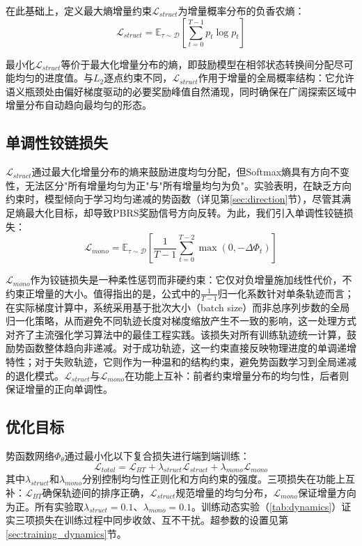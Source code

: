 在此基础上，定义最大熵增量约束$\mathcal{L}_{struct}$为增量概率分布的负香农熵：
\begin{equation}
\label{eq:lstruct}
    \mathcal{L}_{struct} = \mathbb{E}_{\tau \sim \mathcal{D}} \left[ \sum_{t=0}^{T-1} p_t \log p_t \right]
\end{equation}

最小化$\mathcal{L}_{struct}$等价于最大化增量分布的熵，即鼓励模型在相邻状态转换间分配尽可能均匀的进度值。与$L_2$逐点约束不同，$\mathcal{L}_{struct}$作用于增量的全局概率结构：它允许语义瓶颈处由偏好梯度驱动的必要奖励峰值自然涌现，同时确保在广阔探索区域中增量分布自动趋向最均匀的形态。

\subsection{单调性铰链损失}

$\mathcal{L}_{struct}$通过最大化增量分布的熵来鼓励进度均匀分配，但Softmax熵具有方向不变性，无法区分"所有增量均匀为正"与"所有增量均匀为负"。实验表明，在缺乏方向约束时，模型倾向于学习均匀递减的势函数（详见第\ref{sec:direction}节），尽管其满足熵最大化目标，却导致PBRS奖励信号方向反转。为此，我们引入单调性铰链损失：
\begin{equation}
\label{eq:lmono}
    \mathcal{L}_{mono} = \mathbb{E}_{\tau \sim \mathcal{D}} \left[ \frac{1}{T-1}\sum_{t=0}^{T-2} \max(0, -\Delta\Phi_t) \right]
\end{equation}

$\mathcal{L}_{mono}$作为铰链损失是一种柔性惩罚而非硬约束：它仅对负增量施加线性代价，不约束正增量的大小。值得指出的是，公式中的$\frac{1}{T-1}$归一化系数针对单条轨迹而言；在实际梯度计算中，系统采用基于批次大小（batch size）而非总序列步数的全局归一化策略，从而避免不同轨迹长度对梯度缩放产生不一致的影响，这一处理方式对齐了主流强化学习算法中的最佳工程实践。该损失对所有训练轨迹统一计算，鼓励势函数整体趋向非递减。对于成功轨迹，这一约束直接反映物理进度的单调递增特性；对于失败轨迹，它则作为一种温和的结构约束，避免势函数学习到全局递减的退化模式。$\mathcal{L}_{struct}$与$\mathcal{L}_{mono}$在功能上互补：前者约束增量分布的均匀性，后者则保证增量的正向单调性。

\subsection{优化目标}
\label{sec:joint_objective}

势函数网络$\Phi_\theta$通过最小化以下复合损失进行端到端训练：
\begin{equation}
\label{eq:total_loss}
    \mathcal{L}_{total} = \mathcal{L}_{BT} + \lambda_{struct} \mathcal{L}_{struct} + \lambda_{mono} \mathcal{L}_{mono}
\end{equation}
其中$\lambda_{struct}$和$\lambda_{mono}$分别控制均匀性正则化和方向约束的强度。三项损失在功能上互补：$\mathcal{L}_{BT}$确保轨迹间的排序正确，$\mathcal{L}_{struct}$规范增量的均匀分布，$\mathcal{L}_{mono}$保证增量方向为正。所有实验取$\lambda_{struct} = 0.1$、$\lambda_{mono} = 0.1$。训练动态实验（\cref{tab:dynamics}）证实三项损失在训练过程中同步收敛、互不干扰。超参数的设置见第\ref{sec:training_dynamics}节。


